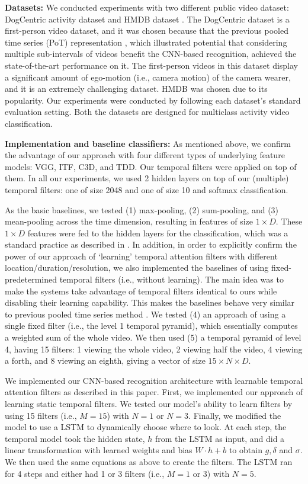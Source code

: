 \documentclass[letterpaper]{article}
\begin{document}
{\flushleft\textbf{Datasets:} We conducted experiments with two different public video dataset: DogCentric activity dataset \cite{ryoo14dog} and HMDB dataset \cite{kuehne11}. The DogCentric dataset is a first-person video dataset, and it was chosen because that the previous pooled time series (PoT) representation \cite{ryoo15}, which illustrated potential that considering multiple sub-intervals of videos benefit the CNN-based recognition, achieved the state-of-the-art performance on it.  The first-person videos in this dataset display a significant amount of ego-motion (i.e., camera motion) of the camera wearer, and it is an extremely challenging dataset. HMDB was chosen due to its popularity. Our experiments were conducted by following each dataset's standard evaluation setting. Both the datasets are designed for multiclass activity video classification.}


{\flushleft\textbf{Implementation and baseline classifiers:} As mentioned above, we confirm the advantage of our approach with four different types of underlying feature models: VGG, ITF, C3D, and TDD. Our temporal filters were applied on top of them. In all our experiments, we used 2 hidden layers on top of our (multiple) temporal filters: one of size 2048 and one of size 10 and softmax classification.}

As the basic baselines, we tested (1) max-pooling, (2) sum-pooling, and (3) mean-pooling across the time dimension, resulting in features of size $1\times D$. These $1\times D$ features were fed to the hidden layers for the classification, which was a standard practice as described in \cite{jain14,karpathy14,simonyan14,google15,c3d}. In addition, in order to explicitly confirm the power of our approach of `learning' temporal attention filters with different location/duration/resolution, we also implemented the baselines of using fixed-predetermined temporal filters (i.e., without learning). The main idea was to make the systems take advantage of temporal filters identical to ours while disabling their learning capability. This makes the baselines behave very similar to previous pooled time series method \cite{ryoo15}. We tested (4) an approach of using a single fixed filter (i.e., the level 1 temporal pyramid), which essentially computes a weighted sum of the whole video. We then used (5) a temporal pyramid of level 4, having 15 filters: 1 viewing the whole video, 2 viewing half the video, 4 viewing a forth, and 8 viewing an eighth, giving a vector of size $15\times N\times D$.

We implemented our CNN-based recognition architecture with learnable temporal attention filters as described in this paper. First, we implemented our approach of learning static temporal filters. We tested our model's ability to learn filters by using 15 filters (i.e., $M=15$) with $N=1$ or $N=3$. Finally, we modified the model to use a LSTM to dynamically choose where to look. At each step, the temporal model took the hidden state, $h$ from the LSTM as input, and did a linear transformation with learned weights and bias $W\cdot h + b$ to obtain $g, \delta$ and $\sigma$. We then used the same equations as above to create the filters. The LSTM ran for 4 steps and either had 1 or 3 filters (i.e., $M=1$ or $3$) with $N=5$.
\end{document}
